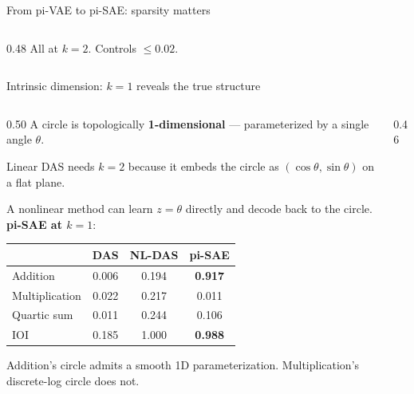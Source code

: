 \documentclass[aspectratio=169,11pt]{beamer}
\begin{document}
\begin{frame}{From pi-VAE to pi-SAE: sparsity matters}
\begin{columns}[T]
\begin{column}{0.48\textwidth}
\vspace{0.2em}
{\small All at $k{=}2$. Controls $\leq 0.02$.}
\end{column}
\end{columns}

\vspace{0.5em}
\centering
{}
\end{frame}

\begin{frame}{Intrinsic dimension: $k{=}1$ reveals the true structure}

\begin{columns}[T]
\begin{column}{0.50\textwidth}
{\small A circle is topologically \textbf{1-dimensional} --- parameterized by a single angle $\theta$.}

\vspace{0.3em}
{\small Linear DAS needs $k{=}2$ because it embeds the circle as $(\cos\theta, \sin\theta)$ on a flat plane.}

\vspace{0.3em}
{\small A nonlinear method can learn $z = \theta$ directly and decode back to the circle. \textbf{pi-SAE at $k{=}1$}:}

\vspace{0.3em}
{\small\setlength{\tabcolsep}{4pt}
\begin{tabular}{@{}lccc@{}}
\toprule
& \textbf{DAS} & \textbf{NL-DAS} & \textbf{pi-SAE} \\
\midrule
Addition & 0.006 & 0.194 & \textbf{\textcolor{always}{0.917}} \\
Multiplication & 0.022 & 0.217 & 0.011 \\
Quartic sum & 0.011 & 0.244 & 0.106 \\
IOI & 0.185 & 1.000 & \textbf{\textcolor{always}{0.988}} \\
\bottomrule
\end{tabular}}

\vspace{0.3em}
{\small Addition's circle admits a smooth 1D parameterization. Multiplication's discrete-log circle does not.}
\end{column}
\begin{column}{0.46\textwidth}
\centering
{}
\end{column}
\end{columns}
\end{frame}
\end{document}
